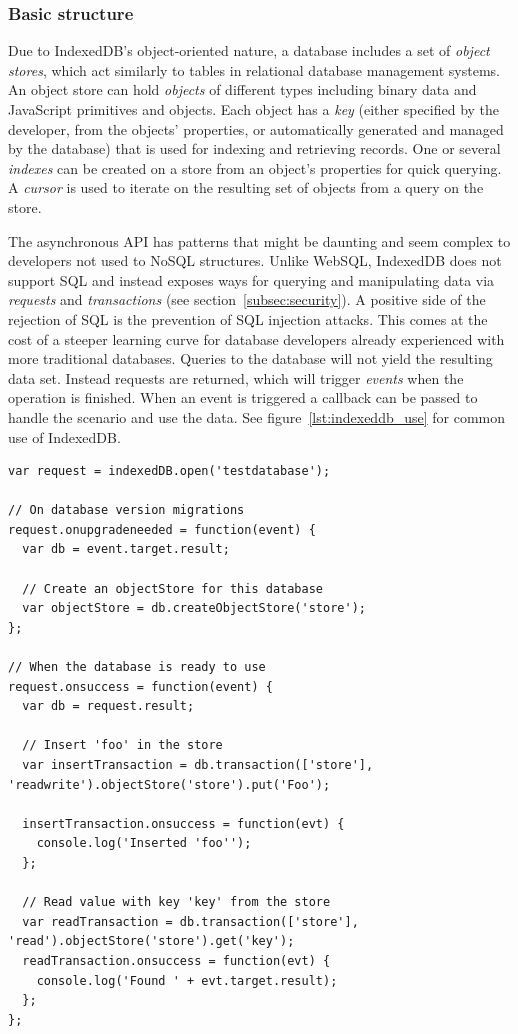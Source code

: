 \subsubsection{Basic structure}
Due to IndexedDB's object-oriented nature, a database includes a set of \emph{object stores}, which act similarly to tables in relational database management systems. An object store can hold \emph{objects} of different types including binary data and JavaScript primitives and objects. Each object has a \emph{key} (either specified by the developer, from the objects' properties, or automatically generated and managed by the database) that is used for indexing and retrieving records. One or several \emph{indexes} can be created on a store from an object's properties for quick querying. A \emph{cursor} is used to iterate on the resulting set of objects from a query on the store.

The asynchronous API has patterns that might be daunting and seem complex to developers not used to NoSQL structures. Unlike WebSQL, IndexedDB does not support SQL and instead exposes ways for querying and manipulating data via \emph{requests} and \emph{transactions} (see section~\ref{subsec:security}). A positive side of the rejection of SQL is the prevention of SQL injection attacks. This comes at the cost of a steeper learning curve for database developers already experienced with more traditional databases. Queries to the database will not yield the resulting data set. Instead requests are returned, which will trigger \emph{events} when the operation is finished. When an event is triggered a callback can be passed to handle the scenario and use the data. See figure~\ref{lst:indexeddb_use} for common use of IndexedDB.

\begin{Code}
\begin{lstlisting}[caption={Use of IndexedDB}, label={lst:indexeddb_use}]
var request = indexedDB.open('testdatabase');

// On database version migrations
request.onupgradeneeded = function(event) {
  var db = event.target.result;

  // Create an objectStore for this database
  var objectStore = db.createObjectStore('store');
};

// When the database is ready to use
request.onsuccess = function(event) {
  var db = request.result;

  // Insert 'foo' in the store
  var insertTransaction = db.transaction(['store'], 'readwrite').objectStore('store').put('Foo');

  insertTransaction.onsuccess = function(evt) {
    console.log('Inserted 'foo'');
  };

  // Read value with key 'key' from the store
  var readTransaction = db.transaction(['store'], 'read').objectStore('store').get('key');
  readTransaction.onsuccess = function(evt) {
    console.log('Found ' + evt.target.result);
  };
};
\end{lstlisting}
\end{Code}

